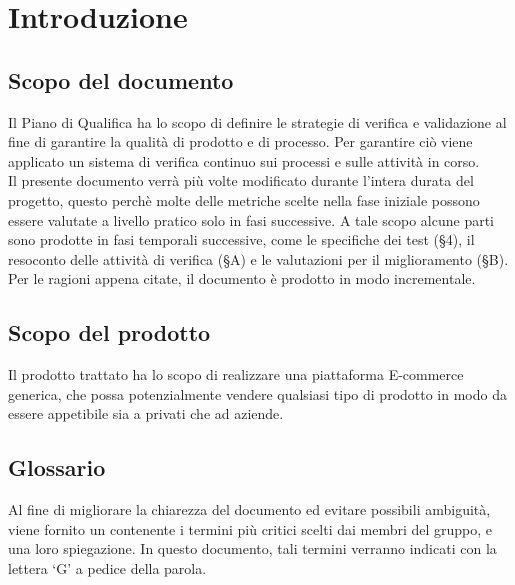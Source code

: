 \section{Introduzione}

\subsection{Scopo del documento}
Il Piano di Qualifica ha lo scopo di definire le strategie di verifica e validazione al fine di garantire la qualità di prodotto e di processo. Per garantire ciò viene applicato un sistema di verifica continuo sui processi e sulle attività in corso.\\
Il presente documento verrà più volte modificato durante l'intera durata del progetto, questo perchè molte delle metriche scelte nella fase iniziale possono essere valutate a livello pratico solo in fasi successive. A tale scopo alcune parti sono prodotte in fasi temporali successive, come le specifiche dei test (§4), il resoconto delle attività di verifica (§A) e le valutazioni per il miglioramento (\S{B}). Per le ragioni appena citate, il documento è prodotto in modo incrementale.

\subsection{Scopo del prodotto}
Il prodotto trattato ha lo scopo di realizzare una piattaforma E-commerce generica, che possa potenzialmente vendere qualsiasi tipo di prodotto in modo da essere appetibile sia a privati che ad aziende.

\subsection{Glossario}
Al fine di migliorare la chiarezza del documento ed evitare possibili ambiguità, viene fornito un
\Glossario{} contenente i termini più critici scelti dai membri del gruppo, e una loro spiegazione.
In questo documento, tali termini verranno indicati con la lettera `G’ a pedice della parola.

